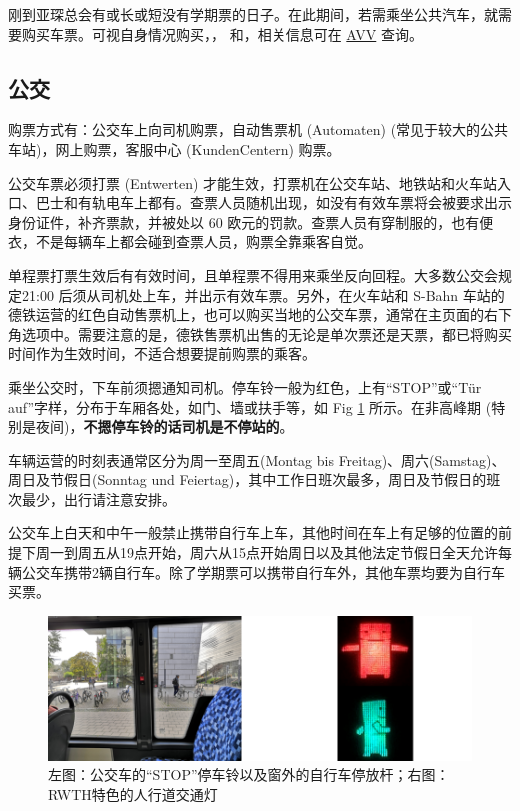     刚到亚琛总会有或长或短没有学期票的日子。在此期间，若需乘坐公共汽车，就需要购买车票。可视自身情况购买，， 和，相关信息可在 \href{http://www.avv.de/}{AVV} 查询。

  \subsection{公交}\label{subsec:公交}

    购票方式有：公交车上向司机购票，自动售票机 (Automaten) (常见于较大的公共车站)，网上购票，客服中心 (KundenCentern) 购票。

    公交车票必须打票 (Entwerten) 才能生效，打票机在公交车站、地铁站和火车站入口、巴士和有轨电车上都有。查票人员随机出现，如没有有效车票将会被要求出示身份证件，补齐票款，并被处以 60 欧元的罚款。查票人员有穿制服的，也有便衣，不是每辆车上都会碰到查票人员，购票全靠乘客自觉。

    单程票打票生效后有有效时间，且单程票不得用来乘坐反向回程。大多数公交会规定21:00 后须从司机处上车，并出示有效车票。另外，在火车站和 S-Bahn 车站的德铁运营的红色自动售票机上，也可以购买当地的公交车票，通常在主页面的右下角选项中。需要注意的是，德铁售票机出售的无论是单次票还是天票，都已将购买时间作为生效时间，不适合想要提前购票的乘客。

    乘坐公交时，下车前须摁通知司机。停车铃一般为红色，上有``STOP''或``Tür auf''字样，分布于车厢各处，如门、墙或扶手等，如 Fig \ref{fig:公交内景和RWTH特色的人行道交通灯} 所示。在非高峰期 (特别是夜间)，\textbf{不摁停车铃的话司机是不停站的}。

    车辆运营的时刻表通常区分为周一至周五(Montag bis Freitag)、周六(Samstag)、周日及节假日(Sonntag und Feiertag)，其中工作日班次最多，周日及节假日的班次最少，出行请注意安排。

    公交车上白天和中午一般禁止携带自行车上车，其他时间在车上有足够的位置的前提下周一到周五从19点开始，周六从15点开始周日以及其他法定节假日全天允许每辆公交车携带2辆自行车。除了学期票可以携带自行车外，其他车票均要为自行车买票。

    \begin{figure}[ht]
      \centering
      \includegraphics[width=.8\textwidth]{在亚琛学习和生活/Verkersmittel/公交内景和RWTH特色的人行道交通灯.png}
      \caption{左图：公交车的``STOP''停车铃以及窗外的自行车停放杆；右图：RWTH特色的人行道交通灯}
      \label{fig:公交内景和RWTH特色的人行道交通灯}
    \end{figure}

